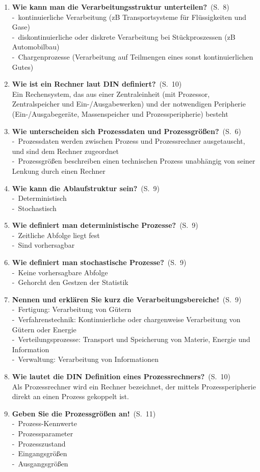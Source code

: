 \documentclass[a4paper,12pt]{article}
\newcommand{\question}[3]{\pagebreak[3]\item {\textbf{#1?}}\ (S.\ #2)#3}
\newcommand{\statement}[3]{\pagebreak[3]\item {\textbf{#1!}}\ (S.\ #2)#3}
\newcommand{\catchword}[1]{\\-\ #1}
\newcommand{\normaltext}[1]{\\#1}
\newcommand{\page}[1]{#1}
\begin{document}
\begin{enumerate}
  \question{Wie kann man die Verarbeitungsstruktur unterteilen}{\page{8}}
  {
    \catchword{kontinuierliche Verarbeitung (zB Transportsysteme für Flüssigkeiten und Gase)}
    \catchword{diskontinuierliche oder diskrete Verarbeitung bei Stückproszessen (zB Automobilbau)}
    \catchword{Chargenprozesse (Verarbeitung auf Teilmengen eines sonst kontinuierlichen Gutes)}
  }

  \question{Wie ist ein Rechner laut DIN definiert}{\page{10}}
  {
    \normaltext{Ein Rechensystem, das aus einer Zentraleinheit (mit Prozessor, Zentralspeicher und 
     Ein-/Ausgabewerken) und der notwendigen Peripherie (Ein-/Ausgabegeräte, Massenspeicher und
     Prozessperipherie) besteht}
  }

  \question{Wie unterscheiden sich Prozessdaten und Prozessgrößen}{\page{6}}
  {
    \catchword{Prozessdaten werden zwischen Prozess und Prozessrechner ausgetauscht, und sind 
    dem Rechner zugeordnet}
    \catchword{Prozessgrößen beschreiben einen technischen Prozess unabhängig von seiner Lenkung
    durch einen Rechner}
  }

  \question{Wie kann die Ablaufstruktur sein}{\page{9}}
  {
    \catchword{Deterministisch}
    \catchword{Stochastisch}
  }

  \question{Wie definiert man deterministische Prozesse}{\page{9}}
  {
    \catchword{Zeitliche Abfolge liegt fest}
    \catchword{Sind vorhersagbar}
  }

  \question{Wie definiert man stochastische Prozesse}{\page{9}}
  {
    \catchword{Keine vorhersagbare Abfolge}
    \catchword{Gehorcht den Gestzen der Statistik}
  }

  \statement{Nennen und erklären Sie kurz die Verarbeitungsbereiche}{\page{9}}
  {
    \catchword{Fertigung: Verarbeitung von Gütern}
    \catchword{Verfahrenstechnik: Kontinuierliche oder chargenweise Verarbeitung
               von Gütern oder Energie}
    \catchword{Verteilungsprozesse: Transport und Speicherung von Materie, Energie und Information}
    \catchword{Verwaltung: Verarbeitung von Informationen}
  }

  \question{Wie lautet die DIN Definition eines Prozessrechners}{\page{10}}
  {
    \normaltext{Als Prozessrechner wird ein Rechner bezeichnet, der mittels Prozessperipherie direkt
                an einen Prozess gekoppelt ist.}
  }

  \statement{Geben Sie die Prozessgrößen an}{\page{11}}
  {
    \catchword{Prozess-Kennwerte}
    \catchword{Prozessparameter}
    \catchword{Prozesszustand}
    \catchword{Eingangsgrößen}
    \catchword{Ausgangsgrößen}
  }


\end{enumerate}
\end{document}
